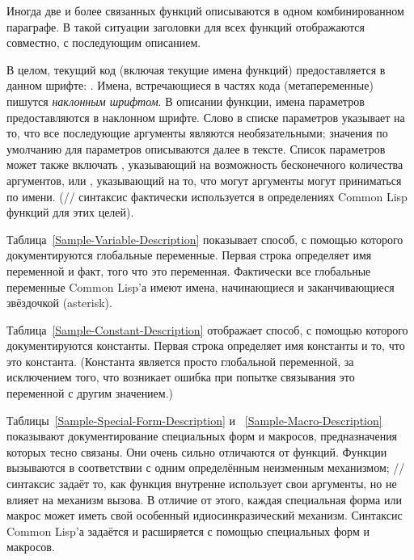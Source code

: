 Иногда две и более связанных функций описываются в одном комбинированном
параграфе. В такой ситуации заголовки для всех функций отображаются совместно, с
последующим описанием.

В целом, текущий код (включая текущие имена функций) предоставляется в данном
шрифте: .
Имена, встречающиеся в частях кода (метапеременные) пишутся \emph{наклонным
шрифтом}. В описании функции, имена параметров предоставляются в наклонном
шрифте. Слово  в списке параметров указывает на то, что все
последующие аргументы являются необязательными; значения по умолчанию для
параметров описываются далее в тексте. Список параметров может также
включать , указывающий на возможность бесконечного количества
аргументов, или , указывающий на то, что могут аргументы могут
приниматься по имени.
(// синтаксис фактически используется в
определениях Common Lisp функций для этих целей).

Таблица~\ref{Sample-Variable-Description} показывает способ, с помощью которого
документируются глобальные переменные. Первая строка определяет имя переменной и 
факт, того что это переменная.
Фактически все глобальные переменные Common Lisp'а имеют имена, начинающиеся и
заканчивающиеся звёздочкой (asterisk).

Таблица~\ref{Sample-Constant-Description} отображает способ, с помощью которого
документируются константы. Первая строка определяет имя константы и то, что это
константа.
(Константа является просто глобальной переменной, за исключением того, что
возникает ошибка при попытке связывания это переменной с другим значением.)

Таблицы~\ref{Sample-Special-Form-Description} и ~\ref{Sample-Macro-Description}
показывают документирование специальных форм и макросов, предназначения которых
тесно связаны.
Они очень сильно отличаются от функций.
Функции вызываются в соответствии с одним определённым неизменным механизмом;
// синтаксис задаёт то, как функция
внутренне использует свои аргументы, но не влияет на механизм вызова.
В отличие от этого, каждая специальная форма или макрос может иметь свой
особенный идиосинкразический механизм. Синтаксис Common Lisp'а задаётся и
расширяется с помощью специальных форм и макросов.

